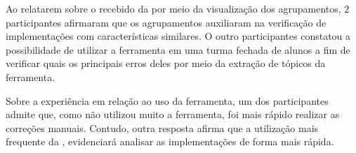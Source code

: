 		Ao relatarem sobre o  recebido da 
		por meio da visualização dos agrupamentos, $2$ participantes afirmaram que
		os agrupamentos auxiliaram na verificação de implementações com características
		similares. O outro participantes constatou a possibilidade de utilizar a
		ferramenta em uma turma fechada de alunos a fim de verificar quais os principais
		erros deles por meio da extração de tópicos da ferramenta.
		
		Sobre a experiência em relação ao uso da ferramenta, um dos participantes
		admite que, como não utilizou muito a ferramenta, foi mais rápido realizar
		as correções manuais. Contudo, outra resposta afirma que a utilização mais
		frequente da , evidenciará analisar as implementações
		de forma mais rápida.
		
